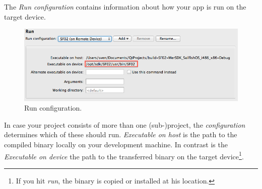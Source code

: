 The \emph{Run configuration} contains information about how your app is run on the target device.
%
\begin{figure}[H]
  \centering
  \includegraphics[scale=0.5]{../media/gfx/QtCreator/RunSettings.png} 
  \caption{Run configuration.}
  \label{fig:RunSettings}
\end{figure}
%
In case your project consists of more than one (sub-)project, the \emph{configuration} determines which of these should run. \emph{Executable on host} is the path to the compiled binary locally on your development machine. In contrast is the \emph{Executable on device} the path to the transferred binary on the target device\footnote{If you hit \emph{run}, the binary is copied or installed at his location.}.

